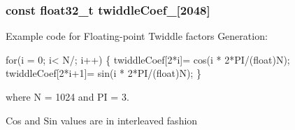 \subsubsection[{\texorpdfstring{twiddle\+Coef\+\_\+1024}{twiddleCoef_1024}}]{\setlength{\rightskip}{0pt plus 5cm}const float32\+\_\+t twiddle\+Coef\+\_\mbox{[}2048\mbox{]}}\hypertarget{group__CFFT__CIFFT_ga27c056eb130a4333d1cc5dd43ec738b1}{}\label{group__CFFT__CIFFT_ga27c056eb130a4333d1cc5dd43ec738b1}
\begin{DoxyParagraph}{}
Example code for Floating-\/point Twiddle factors Generation\+: 
\end{DoxyParagraph}
\begin{DoxyParagraph}{}

\begin{DoxyPre}for(i = 0; i< N/; i++)
\{
  twiddleCoef[2*i]= cos(i * 2*PI/(float)N);
  twiddleCoef[2*i+1]= sin(i * 2*PI/(float)N);
\} \end{DoxyPre}
 
\end{DoxyParagraph}
\begin{DoxyParagraph}{}
where N = 1024 and PI = 3. 
\end{DoxyParagraph}
\begin{DoxyParagraph}{}
Cos and Sin values are in interleaved fashion 
\end{DoxyParagraph}
